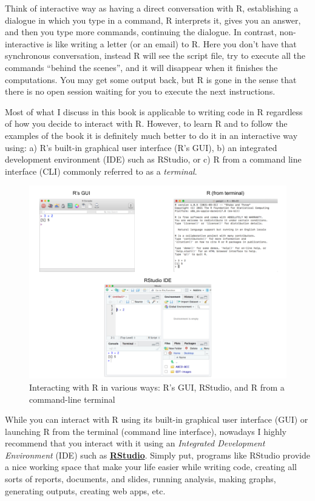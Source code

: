 \documentclass[
]{book}
\begin{document}
Think of interactive way as having a direct conversation with R, establishing
a dialogue in which you type in a command, R interprets it, gives you an
answer, and then you type more commands, continuing the dialogue. In contrast,
non-interactive is like writing a letter (or an email) to R. Here you don't
have that synchronous conversation, instead R will see the script file, try to
execute all the commands ``behind the scenes'', and it will disappear when it
finishes the computations. You may get some output back, but R is gone in the
sense that there is no open session waiting for you to execute the next
instructions.

Most of what I discuss in this book is applicable to writing code in R
regardless of how you decide to interact with R. However, to learn R and to
follow the examples of the book it is definitely much better to do it in an
interactive way using: a) R's built-in graphical user interface (R's GUI),
b) an integrated development environment (IDE) such as RStudio, or
c) R from a command line interface (CLI) commonly referred to as a \emph{terminal}.

\begin{figure}

{\centering \includegraphics[width=0.9\linewidth]{images/install/r-interactive-ways} 

}

\caption{Interacting with R in various ways: R's GUI, RStudio, and R from a command-line terminal}\label{fig:unnamed-chunk-4}
\end{figure}

While you can interact with R using its built-in graphical user interface (GUI)
or launching R from the terminal (command line interface), nowadays I highly
recommend that you interact with it using an
\emph{Integrated Development Environment} (IDE) such as
\href{https://www.rstudio.com/}{\textbf{RStudio}}. Simply put,
programs like RStudio provide a nice working space that make your life easier
while writing code, creating all sorts of reports, documents, and slides,
running analysis, making graphs, generating outputs, creating web apps, etc.
\end{document}
